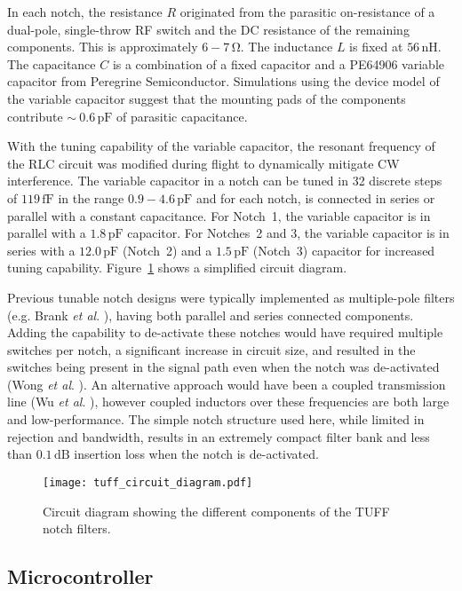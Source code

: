 \documentclass[preprint,12pt]{elsarticle}
\begin{document}
In each notch, the resistance $R$
originated from the parasitic on-resistance of a dual-pole, single-throw
RF switch and the DC resistance of the remaining components. This is approximately $6 - 7\,\mathrm{\Omega}$. 
The inductance $L$ is fixed at $56\,\mathrm{nH}$. The capacitance $C$ is a
combination of a fixed capacitor and a PE64906 variable capacitor from
Peregrine Semiconductor. Simulations using the device model of the
variable capacitor suggest that the mounting pads of the components
contribute $\sim~0.6\,\mbox{pF}$ of parasitic capacitance.

With the 
tuning capability of the variable capacitor, the resonant frequency of the RLC circuit was 
modified during flight to dynamically mitigate CW interference. 
The variable capacitor in a notch can be 
tuned in 32 discrete steps of $119\,\mathrm{fF}$ in the range $0.9-4.6\,\mathrm{pF}$ and for 
each notch, is connected in series or parallel with a constant capacitance. 
For Notch~1, the variable capacitor is 
in parallel with a $1.8\,\mathrm{pF}$ capacitor. For Notches~2 and 3, the variable capacitor is in 
series with a $12.0\,\mathrm{pF}$ (Notch~2) and a $1.5\,\mathrm{pF}$ (Notch~3) capacitor for 
increased tuning capability. Figure~\ref{circuit} shows a simplified circuit diagram.

Previous tunable notch designs were typically
 implemented as multiple-pole filters (e.g. Brank \textit{et al}. \cite{brank}), 
 having both parallel and series connected components. 
 Adding the capability to de-activate these notches would have required multiple switches per notch, 
 a significant increase in circuit size, and resulted in the switches 
 being present in the signal path even when the notch was de-activated (Wong \textit{et al}. \cite{wong}). 
 An alternative approach would have been a coupled transmission line (Wu \textit{et al}. \cite{wu}), 
 however coupled inductors over these frequencies are both large and low-performance. 
 The simple notch structure used here, while limited in rejection and bandwidth, 
 results in an extremely compact filter bank and less than $0.1\,\mathrm{dB}$ insertion 
 loss when the notch is de-activated.

\begin{figure}[H]
\centering
\texttt{[image: tuff\_circuit\_diagram.pdf]}
\caption{Circuit diagram showing the different components of the TUFF notch filters.}
\label{circuit}
\end{figure}

\subsection{Microcontroller}
\end{document}
